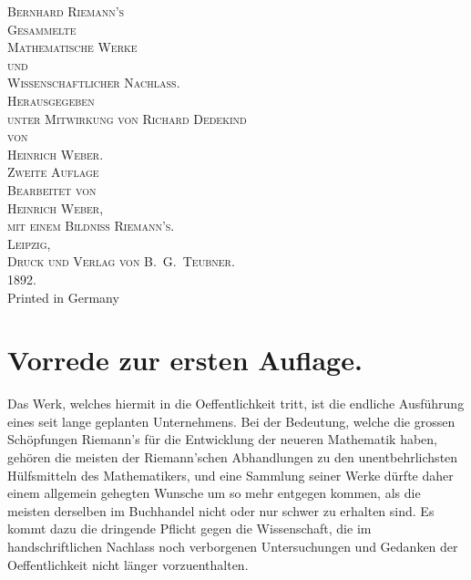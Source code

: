 \documentclass[11pt,a4paper]{article}
\theoremstyle{plain}
\theoremstyle{definition}
\begin{document}
\thispagestyle{empty}
\begin{center}
\vspace*{2cm}
{\Large\textsc{Bernhard Riemann's}}\\[0.5cm]
{\LARGE\textsc{Gesammelte}}\\[0.3cm]
{\LARGE\textsc{Mathematische Werke}}\\[0.5cm]
{\large\textsc{und}}\\[0.5cm]
{\Large\textsc{Wissenschaftlicher Nachlass.}}\\[1.5cm]
{\large\textsc{Herausgegeben}}\\[0.3cm]
{\large\textsc{unter Mitwirkung von Richard Dedekind}}\\[0.3cm]
{\large\textsc{von}}\\[0.3cm]
{\Large\textsc{Heinrich Weber.}}\\[1.5cm]
{\large\textsc{Zweite Auflage}}\\[0.5cm]
{\normalsize\textsc{Bearbeitet von}}\\[0.3cm]
{\large\textsc{Heinrich Weber,}}\\[0.3cm]
{\small\textsc{mit einem Bildniss Riemann's.}}\\[1.5cm]
{\large\textsc{Leipzig,}}\\[0.3cm]
{\large\textsc{Druck und Verlag von B.\ G.\ Teubner.}}\\[0.5cm]
{\large\textsc{1892.}}\\[0.3cm]
{\small Printed in Germany}
\end{center}
\clearpage

\section*{Vorrede zur ersten Auflage.}

Das Werk, welches hiermit in die Oeffentlichkeit tritt, ist die endliche Ausf\"uhrung eines seit lange geplanten Unternehmens. Bei der Bedeutung, welche die grossen Sch\"opfungen Riemann's f\"ur die Entwicklung der neueren Mathematik haben, geh\"oren die meisten der Riemann'schen Abhandlungen zu den unentbehrlichsten H\"ulfsmitteln des Mathematikers, und eine Sammlung seiner Werke d\"urfte daher einem allgemein gehegten Wunsche um so mehr entgegen kommen, als die meisten derselben im Buchhandel nicht oder nur schwer zu erhalten sind. Es kommt dazu die dringende Pflicht gegen die Wissenschaft, die im handschriftlichen Nachlass noch verborgenen Untersuchungen und Gedanken der Oeffentlichkeit nicht l\"anger vorzuenthalten.
\end{document}

